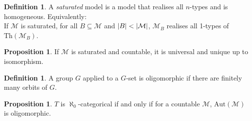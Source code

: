\documentclass[a4paper,10pt]{article}
\theoremstyle{definition}
\DeclarePairedDelimiter\abs{\lvert}{\rvert}
\newtheorem{definition}[theorem]{Definition}
\newtheorem{proposition}[theorem]{Proposition}
\begin{document}
\begin{definition}
    A \emph{saturated} model is a model that realises all $n$-types and is homogeneous. Equivalently: \\
    If $\mathcal{M}$ is saturated, for all $B \subseteq \mathcal{M}$ and $\abs{B} < \abs{\mathcal{M}}$, $\mathcal{M}_B$ realises all 1-types of $\mathrm{Th}(\mathcal{M}_B)$.
\end{definition}

\begin{proposition}
    If $\mathcal{M}$ is saturated and countable, it is universal and unique up to isomorphism.
\end{proposition}

\begin{definition}
    A group $G$ applied to a $G$-set is oligomorphic if there are finitely many orbits of $G$.
\end{definition}
\begin{proposition}
    $T$ is $\aleph_0$-categorical if and only if for a countable $\mathcal{M}$, $\mathrm{Aut}(\mathcal{M})$ is oligomorphic.
\end{proposition}
\end{document}
